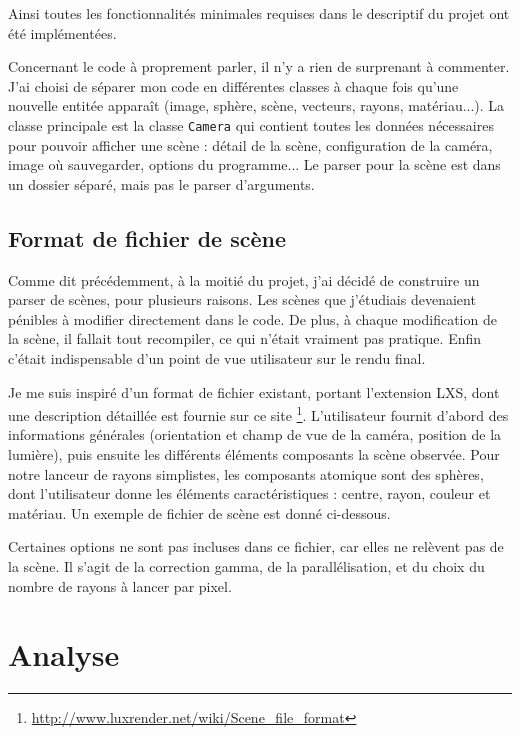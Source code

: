 \documentclass[a4paper,10pt]{article}
\begin{document}
Ainsi toutes les fonctionnalités minimales requises dans le descriptif du projet ont été implémentées.

Concernant le code à proprement parler, il n'y a rien de surprenant à commenter. J'ai choisi de séparer mon code en différentes classes à chaque fois qu'une nouvelle entitée apparaît (image, sphère, scène, vecteurs, rayons, matériau...). La classe principale est la classe \texttt{Camera} qui contient toutes les données nécessaires pour pouvoir afficher une scène : détail de la scène, configuration de la caméra, image où sauvegarder, options du programme... Le parser pour la scène est dans un dossier séparé, mais pas le parser d'arguments.

\subsection{Format de fichier de scène}

Comme dit précédemment, à la moitié du projet, j'ai décidé de construire un parser de scènes, pour plusieurs raisons. Les scènes que j'étudiais devenaient pénibles à modifier directement dans le code. De plus, à chaque modification de la scène, il fallait tout recompiler, ce qui n'était vraiment pas pratique. Enfin c'était indispensable d'un point de vue utilisateur sur le rendu final.

Je me suis inspiré d'un format de fichier existant, portant l'extension LXS, dont une description détaillée est fournie sur ce site \footnote{\url{http://www.luxrender.net/wiki/Scene_file_format}}. L'utilisateur fournit d'abord des informations générales (orientation et champ de vue de la caméra, position de la lumière), puis ensuite les différents éléments composants la scène observée. Pour notre lanceur de rayons simplistes, les composants atomique sont des sphères, dont l'utilisateur donne les éléments caractéristiques : centre, rayon, couleur et matériau. Un exemple de fichier de scène est donné ci-dessous.



Certaines options ne sont pas incluses dans ce fichier, car elles ne relèvent pas de la scène. Il s'agit de la correction gamma, de la parallélisation, et du choix du nombre de rayons à lancer par pixel.

\section{Analyse}
\end{document}
